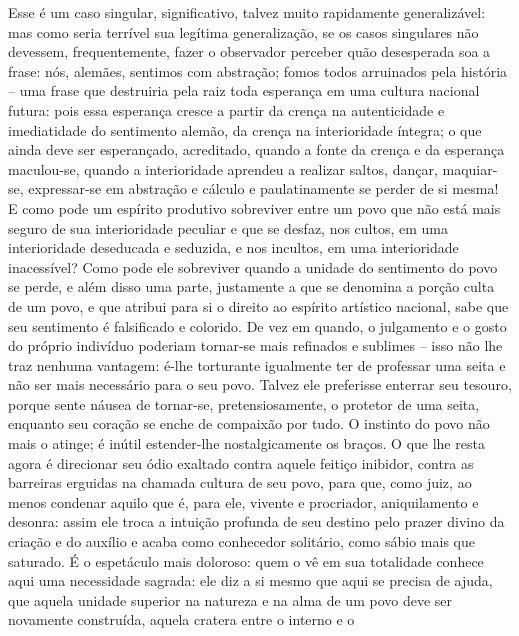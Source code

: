 \begin{enumerate}
\begin{enumerate}
    Esse é um caso singular, significativo, talvez muito rapidamente
    generalizável: mas como seria terrível sua legítima generalização,
    se os casos singulares não devessem, frequentemente, fazer o
    observador perceber quão desesperada soa a frase: nós, alemães,
    sentimos com abstração; fomos todos arruinados pela história -- uma
    frase que destruiria pela raiz toda esperança em uma cultura
    nacional futura: pois essa esperança cresce a partir da crença na
    autenticidade e imediatidade do sentimento alemão, da crença na
    interioridade íntegra; o que ainda deve ser esperançado, acreditado,
    quando a fonte da crença e da esperança maculou-se, quando a
    interioridade aprendeu a realizar saltos, dançar, maquiar-se,
    expressar-se em abstração e cálculo e paulatinamente se perder de si
    mesma! E como pode um espírito produtivo sobreviver entre um povo
    que não está mais seguro de sua interioridade peculiar e que se
    desfaz, nos cultos, em uma interioridade deseducada e seduzida, e
    nos incultos, em uma interioridade inacessível? Como pode ele
    sobreviver quando a unidade do sentimento do povo se perde, e além
    disso uma parte, justamente a que se denomina a porção culta de um
    povo, e que atribui para si o direito ao espírito artístico
    nacional, sabe que seu sentimento é falsificado e colorido. De vez
    em quando, o julgamento e o gosto do próprio indivíduo poderiam
    tornar-se mais refinados e sublimes -- isso não lhe traz nenhuma
    vantagem: é-lhe torturante igualmente ter de professar uma seita e
    não ser mais necessário para o seu povo. Talvez ele preferisse
    enterrar seu tesouro, porque sente náusea de tornar-se,
    pretensiosamente, o protetor de uma seita, enquanto seu coração se
    enche de compaixão por tudo. O instinto do povo não mais o atinge; é
    inútil estender-lhe nostalgicamente os braços. O que lhe resta agora
    é direcionar seu ódio exaltado contra aquele feitiço inibidor,
    contra as barreiras erguidas na chamada cultura de seu povo, para
    que, como juiz, ao menos condenar aquilo que é, para ele, vivente e
    procriador, aniquilamento e desonra: assim ele troca a intuição
    profunda de seu destino pelo prazer divino da criação e do auxílio e
    acaba como conhecedor solitário, como sábio mais que saturado. É o
    espetáculo mais doloroso: quem o vê em sua totalidade conhece aqui
    uma necessidade sagrada: ele diz a si mesmo que aqui se precisa de
    ajuda, que aquela unidade superior na natureza e na alma de um povo
    deve ser novamente construída, aquela cratera entre o interno e o

\end{enumerate}
\end{enumerate}
